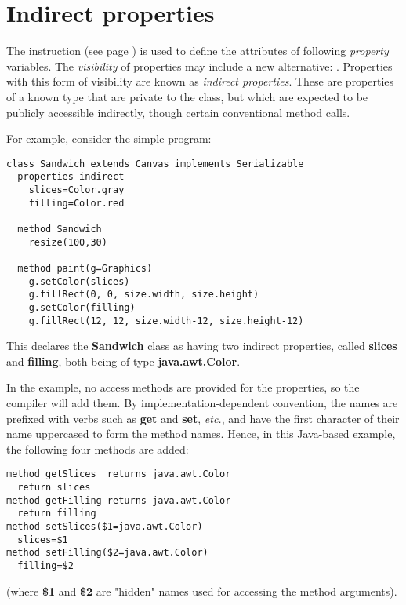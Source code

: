 \section{Indirect properties}\label{refindprop}
 
The   instruction (see page \pageref{refprop})  is used to
define the attributes of following \emph{property} variables.
The \emph{visibility} of properties may include a new alternative:
.
Properties with this form of visibility are known as \emph{indirect
properties}.  These are properties of a known type that are private
to the class, but which are expected to be publicly accessible
indirectly, though certain conventional method calls.
 
For example, consider the simple program:
\begin{lstlisting}[label=sandwich,caption=Sandwich.nrx]
class Sandwich extends Canvas implements Serializable
  properties indirect
    slices=Color.gray
    filling=Color.red

  method Sandwich
    resize(100,30)

  method paint(g=Graphics)
    g.setColor(slices)
    g.fillRect(0, 0, size.width, size.height)
    g.setColor(filling)
    g.fillRect(12, 12, size.width-12, size.height-12)
\end{lstlisting}
This declares the \textbf{Sandwich} class as having two indirect
properties, called \textbf{slices} and \textbf{filling}, both being
of type \textbf{java.awt.Color}.
 
In the example, no access methods are provided for the properties, so
the compiler will add them.  By implementation-dependent convention, the
names are prefixed with verbs such as \textbf{get} and \textbf{set},
\emph{etc.}, and have the first character of their name uppercased to form the
method names.
Hence, in this Java-based example, the following four methods are added:
\begin{lstlisting}[label=slices,caption=Slices]
method getSlices  returns java.awt.Color
  return slices
method getFilling returns java.awt.Color
  return filling
method setSlices($1=java.awt.Color)
  slices=$1
method setFilling($2=java.awt.Color)
  filling=$2
\end{lstlisting}
(where \textbf{\$1} and \textbf{\$2} are "hidden" names used for
accessing the method arguments).
 
